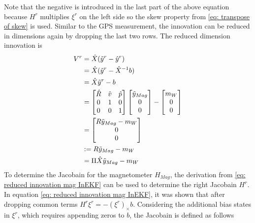 Note that the negative is introduced in the last part of the above equation because $H^r$ multiplies $\xi^r$ on the left side so the skew property from \eqref{eq: transpose of skew} is used. Similar to the GPS measurement, the innovation can be reduced in dimensions again by dropping the last two rows. The reduced dimension innovation is
\begin{equation}
    \begin{split}
        V^r &= \hat{X} (\Tilde{y}^r - \hat{y}^r) \\
            &= \hat{X} (\Tilde{y}^r - \hat{X}^{-1} b) \\
            &= \hat{X} \Tilde{y}^r - b \\
            &= \begin{bmatrix}
            \hat{R} & \hat{v} & \hat{p} \\
            0 & 1 & 0\\
            0 & 0 & 1
        \end{bmatrix} 
        \begin{bmatrix}
            \Tilde{y}_{Mag} \\
            0 \\
            0
        \end{bmatrix} - 
        \begin{bmatrix}
            m_W \\
            0 \\
            0
        \end{bmatrix} \\
        &= \begin{bmatrix}
            R \Tilde{y}_{Mag} - m_W  \\
            0 \\
            0
        \end{bmatrix} \\
        &:= R \Tilde{y}_{Mag} - m_W \\
        &= \Pi \hat{X} \Tilde{y}_{Mag} - m_W \\
    \end{split}
    \label{eq: reduced innovation mag InEKF}
\end{equation}
To determine the Jacobain for the magnetometer $H_{Mag}$, the derivation from \eqref{eq: reduced innovation mag InEKF} can be used to determine the right Jacobain $H^r$. In equation \eqref{eq: reduced innovation mag InEKF}, it was shown that after dropping common terms $H^r \xi^r = -(\xi^r)_{\times} b$. Considering the additional bias states in $\xi^r$, which requires appending zeros to $b$, the Jacobain is defined as follows

